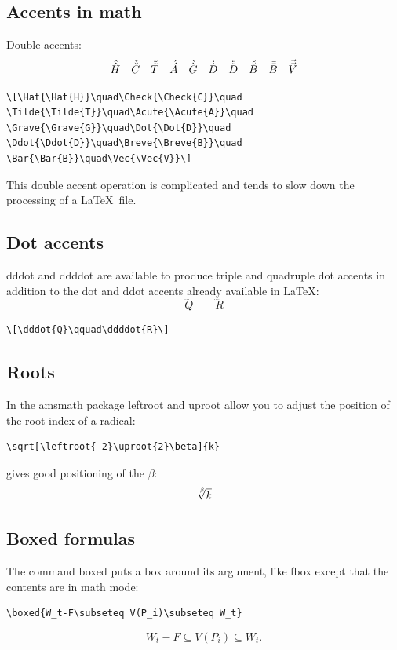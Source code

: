 \documentclass[manuscript, printscheme]{aomart}
\newcommand{\ntt}{\normalfont\ttfamily}
\newcommand{\cn}[1]{{\protect\ntt\bslash#1}}
\newcommand{\pkg}[1]{{\protect\ntt#1}}
\newtheorem[{}\it]{thm}{Theorem}[section]
\theoremstyle{definition}
\newtheorem*[{}\it]{notation}{Notation}
\begin{document}
\subsection{Accents in math}

Double accents:
\[\Hat{\Hat{H}}\quad\Check{\Check{C}}\quad
\Tilde{\Tilde{T}}\quad\Acute{\Acute{A}}\quad
\Grave{\Grave{G}}\quad\Dot{\Dot{D}}\quad
\Ddot{\Ddot{D}}\quad\Breve{\Breve{B}}\quad
\Bar{\Bar{B}}\quad\Vec{\Vec{V}}\]
\begin{verbatim}
\[\Hat{\Hat{H}}\quad\Check{\Check{C}}\quad
\Tilde{\Tilde{T}}\quad\Acute{\Acute{A}}\quad
\Grave{\Grave{G}}\quad\Dot{\Dot{D}}\quad
\Ddot{\Ddot{D}}\quad\Breve{\Breve{B}}\quad
\Bar{\Bar{B}}\quad\Vec{\Vec{V}}\]
\end{verbatim}
This double accent operation is complicated
and tends to slow down the processing of a \LaTeX\ file.


\subsection{Dot accents}
\cn{dddot} and \cn{ddddot} are available to
produce triple and quadruple dot accents
in addition to the \cn{dot} and \cn{ddot} accents already available
in \LaTeX:
\[\dddot{Q}\qquad\ddddot{R}\]
\begin{verbatim}
\[\dddot{Q}\qquad\ddddot{R}\]
\end{verbatim}

\subsection{Roots}

In the \pkg{amsmath} package \cn{leftroot} and \cn{uproot} allow you to adjust
the position of the root index of a radical:
\begin{verbatim}
\sqrt[\leftroot{-2}\uproot{2}\beta]{k}
\end{verbatim}
gives good positioning of the $\beta$:
\[\sqrt[\leftroot{-2}\uproot{2}\beta]{k}\]

\subsection{Boxed formulas} The command \cn{boxed} puts a box around its
argument, like \cn{fbox} except that the contents are in math mode:
\begin{verbatim}
\boxed{W_t-F\subseteq V(P_i)\subseteq W_t}
\end{verbatim}
\[\boxed{W_t-F\subseteq V(P_i)\subseteq W_t}.\]
\end{document}
